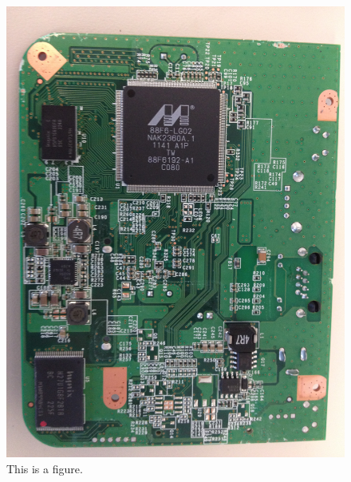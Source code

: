 \begin{figure}[htb]
\begin{center}
\includegraphics[width=\linewidth]{safeplug_bottom}
\caption{This is a figure.}
\end{center}
\end{figure}

